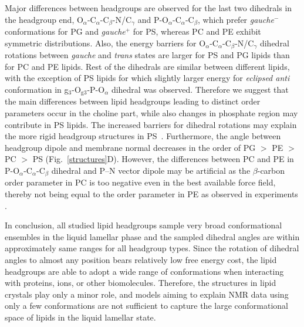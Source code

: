 \documentclass[aps,prl,superscriptaddress,twocolumn]{revtex4}
\begin{document}
Major differences between headgroups are observed for the last two dihedrals in the headgroup end,
O$_\alpha$-C$_\alpha$-C$_\beta$-N/C$_\gamma$ and P-O$_\alpha$-C$_\alpha$-C$_\beta$,
which prefer \textit{gauche$^-$} conformations for PG and \textit{gauche$^+$} for PS,
whereas PC and PE exhibit symmetric distributions.
Also, the energy barriers for O$_\alpha$-C$_\alpha$-C$_\beta$-N/C$_\gamma$ dihedral
rotations between \textit{gauche} and \textit{trans} states are larger for
PS and PG lipids than for PC and PE lipids. 
Rest of the dihedrals are similar between different lipids,
with the exception of PS lipids for which slightly larger energy for \textit{eclipsed anti} conformation
in g$_3$-O$_{{\mathrm g}3}$-P-O$_\alpha$ dihedral was observed.
Therefore we suggest that the main differences between lipid headgroups leading to distinct order parameters occur in the choline part, while also changes in phosphate region may contribute in PS lipids. The increased barriers for dihedral rotations may explain the more rigid headgroup structures in PS~\cite{browning80,buldt81}. Furthermore, the angle between headgroup dipole and membrane normal decreases in the order of PG $>$ PE  $>$ PC  $>$ PS (Fig.~\ref{structures}D). However, the differences between PC and PE in P-O$_\alpha$-C$_\alpha$-C$_\beta$ dihedral
and P--N vector dipole may be artificial as the $\beta$-carbon order parameter in PC is too negative even in the best available force field, thereby not being equal to the order parameter in PE as observed in experiments \cite{botan15}.

In conclusion, all studied lipid headgroups sample very broad conformational ensembles in the liquid lamellar phase and the sampled dihedral angles are within approximately same ranges for all headgroup types. %
Since the rotation of dihedral angles to almost any position bears relatively low free energy cost,
the lipid headgroups are able to adopt a wide range of conformations when interacting with proteins, ions, or other biomolecules.
Therefore, the structures in lipid crystals \cite{buldt81,pascher92} play only a minor role, and models aiming to explain NMR data using only a few conformations \cite{seelig77c,davis83,Semchyschyn04,akutsu20} are not sufficient to capture the large conformational space of lipids in the liquid lamellar state.
\end{document}
